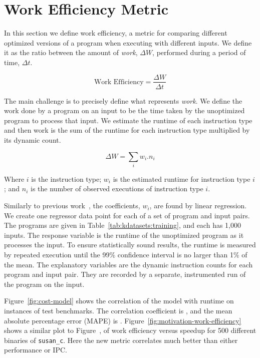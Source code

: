 \section{Work Efficiency Metric} \label{sec:metric}

    In this section we define work efficiency, a metric for comparing different optimized versions of a program when executing with
    different inputs. We define it as the ratio between the amount of \textit{work}, $\Delta W$, performed during a period of time, $\Delta
    t$.

    \[
       \textrm{Work Efficiency} = \frac{\Delta W}{\Delta t}
    \]

    The main challenge is to precisely define what represents \textit{work}. We define the work done by a program on an input to be the
    time taken by the unoptimized program to process that input. We estimate the runtime of each instruction type and then work is the sum
    of the runtime for each instruction type multiplied by its dynamic count.

    \[ \Delta W = \sum_i w_i.n_i \]

    Where $i$ is the instruction type; $w_i$ is the estimated runtime for instruction type $i$; and $n_i$ is the number of observed
    executions of instruction type $i$.

    Similarly to previous work~\citep{giusto01,powell09,brandolese11}, the coefficients, $w_i$, are found by linear regression. We create
    one regressor data point for each of a set of program and input pairs. The programs are given in Table~\ref{tab:kdatasets:training},
    and each has 1,000 inputs. The response variable is the runtime of the unoptimized program as it processes the input. To ensure
    statistically sound results, the runtime is measured by repeated execution until the 99\% confidence interval is no larger than 1\% of
    the mean. The explanatory variables are the dynamic instruction counts for each program and input pair. They are recorded by a separate,
    instrumented run of the program on the input.

    Figure~\ref{fig:cost-model} shows the correlation of the model with runtime on instances of test benchmarks. The correlation
    coefficient is , and the mean absolute percentage error (MAPE) is . Figure~\ref{fig:motivation-work-efficiency}
    shows a similar plot to Figure~\FIXME{\ref{fig:???}}, of work efficiency versus speedup for 500 different binaries of \texttt{susan\_c}. Here the new metric correlates much better than either performance or IPC.

